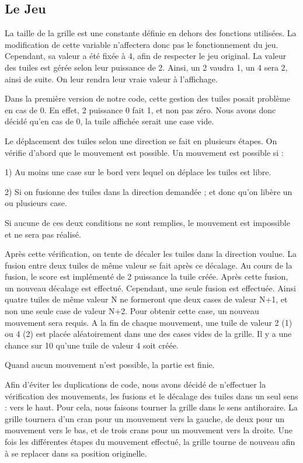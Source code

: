 \documentclass[12pt]{report}
\begin{document}
\subsection{Le Jeu}
La taille de la grille est une constante définie en dehors des fonctions utilisées. La modification de cette variable n’affectera donc pas le fonctionnement du jeu. Cependant, sa valeur a été fixée à 4, afin de respecter le jeu original. La valeur des tuiles est gérée selon leur puissance de 2. Ainsi, un 2 vaudra 1, un 4 sera 2, ainsi de suite. On leur rendra leur vraie valeur à l’affichage.

Dans la première version de notre code, cette gestion des tuiles posait problème en cas de 0. En effet, 2 puissance 0 fait 1, et non pas zéro. Nous avons donc décidé qu’en cas de 0, la tuile affichée serait une case vide.

Le déplacement des tuiles selon une direction se fait en plusieurs étapes. 
On vérifie d’abord que le mouvement est possible. Un mouvement est possible si :

1) Au moins une case sur le bord vers lequel on déplace les tuiles est libre.

2) Si on fusionne des tuiles dans la direction demandée ; et donc qu’on libère un ou plusieurs case.

Si aucune de ces deux conditions ne sont remplies, le mouvement est impossible et ne sera pas réalisé.

Après cette vérification, on tente de décaler les tuiles dans la direction voulue. La fusion entre deux tuiles de même valeur se fait après ce décalage. Au cours de la fusion, le score est implémenté de 2 puissance la tuile créée. Après cette fusion, un nouveau décalage est effectué. Cependant, une seule fusion est effectuée. Ainsi quatre tuiles de même valeur N ne formeront que deux cases de valeur N+1, et non une seule case de valeur N+2. Pour obtenir cette case, un nouveau mouvement sera requis. A la fin de chaque mouvement, une tuile de valeur 2 (1)  ou 4 (2) est placée aléatoirement dans une des cases vides de la grille. Il y a une chance sur 10 qu’une tuile de valeur 4 soit créée.

Quand aucun mouvement n’est possible, la partie est finie. 

Afin d’éviter les duplications de code, nous avons décidé de n’effectuer la vérification des mouvements, les fusions et le décalage des tuiles dans un seul sens : vers le haut. Pour cela, nous faisons tourner la grille dans le sens antihoraire. La grille tournera d’un cran pour un mouvement vers la gauche, de deux pour un mouvement vers le bas, et de trois crans pour un mouvement vers la droite. Une fois les différentes étapes du mouvement effectué, la grille tourne de nouveau afin à se replacer dans sa position originelle.
\end{document}
